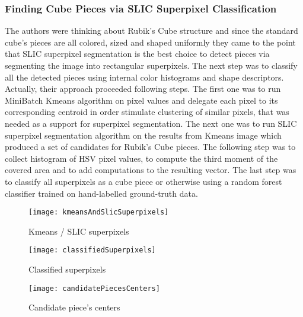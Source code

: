 \documentclass[../../main]{subfiles}
\begin{document}
\subsubsection{Finding Cube Pieces via SLIC Superpixel Classification}
The authors were thinking about Rubik’s Cube structure and since the standard cube’s pieces are all colored, sized and shaped uniformly they came to the point that SLIC superpixel segmentation is the best choice to detect pieces via segmenting the image into rectangular superpixels. The next step was to classify all the detected pieces using internal color histograms and shape descriptors. Actually, their approach proceeded following steps. The first one was to run MiniBatch Kmeans algorithm on pixel values and delegate each pixel to its corresponding centroid in order stimulate clustering of similar pixels, that was needed as a support for superpixel segmentation. The next one was to run SLIC superpixel segmentation algorithm on the results from Kmeans image which produced a set of candidates for Rubik’s Cube pieces. The following step was to collect histogram of HSV pixel values, to compute the third moment of the covered area and to add computations to the resulting vector. The last step was to classify all superpixels as a cube piece or otherwise using a random forest classifier trained on hand-labelled ground-truth data.




\begin{figure} [ht]
\begin{center}
\texttt{[image: kmeansAndSlicSuperpixels]}
\caption{Kmeans / SLIC superpixels}
\label{fig:kmeansAndSlicSuperpixels}
\end{center}
\end{figure}

\begin{figure} [ht]
\begin{center}
\texttt{[image: classifiedSuperpixels]}
\caption{Classified superpixels}
\label{fig:classifiedSuperpixels}
\end{center}
\end{figure} 

\begin{figure} [ht]
\begin{center}
\texttt{[image: candidatePiecesCenters]}
\caption{Candidate piece’s centers}
\label{fig:candidatePiecesCenters}
\end{center}
\end{figure}
\end{document}
